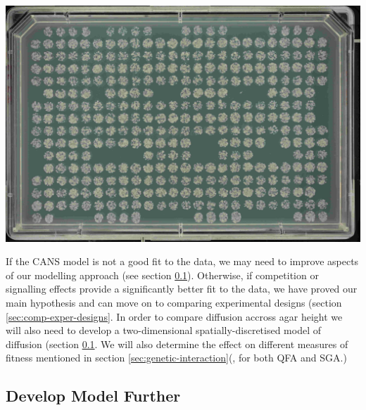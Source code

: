 \begin{Figure}
  \label{fig:gaps}
  \centering
  \includegraphics[width=\linewidth]{DLR00012647-2009-07-02_23-12-49}
\end{Figure}


If the CANS model is not a good fit to the data, we may need to
improve aspects of our modelling approach (see section
\ref{sec:dev-mod-further}). Otherwise, if competition or signalling
effects provide a significantly better fit to the data, we have proved
our main hypothesis and can move on to comparing experimental designs
(section \ref{sec:comp-exper-designs}. In order to compare diffusion
accross agar height we will also need to develop a two-dimensional
spatially-discretised model of diffusion (section
\ref{sec:dev-mod-further}. We will also determine the effect on
different measures of fitness mentioned in section
\ref{sec:genetic-interaction}(, for both QFA and SGA.)
\subsection{Develop Model Further}
\label{sec:dev-mod-further}

